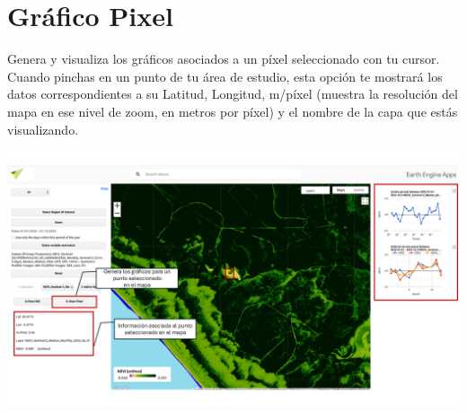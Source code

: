 \documentclass[
]{book}
\begin{document}
\section{\texorpdfstring{\textbf{Gráfico Pixel}}{Gráfico Pixel}}\label{gruxe1fico-pixel-1}

Genera y visualiza los gráficos asociados a un píxel seleccionado con tu cursor. Cuando pinchas en un punto de tu área de estudio, esta opción te mostrará los datos correspondientes a su Latitud, Longitud, m/píxel (muestra la resolución del mapa en ese nivel de zoom, en metros por píxel) y el nombre de la capa que estás visualizando.

\includegraphics{assets/chart_pixel_es.png}

  
\end{document}
